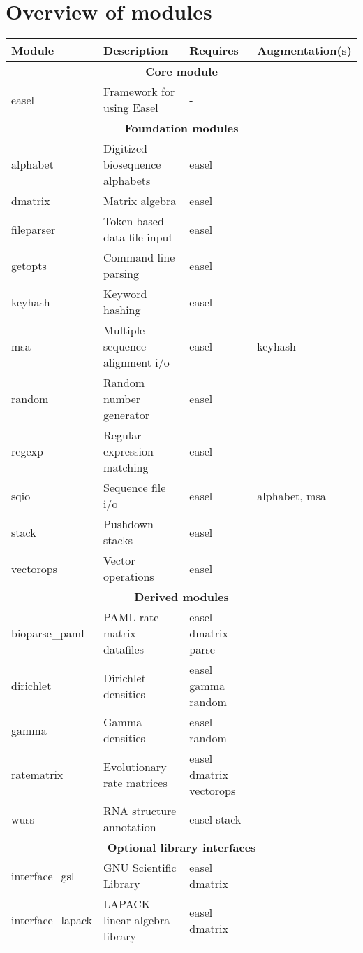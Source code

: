\section{Overview of modules}
\begin{tabular}{llll}\hline
\textbf{Module} & \textbf{Description}       & \textbf{Requires} & \textbf{Augmentation(s)}\\\hline
  \multicolumn{4}{c}{\textbf{Core module}}\\
easel           & Framework for using Easel         &  -     & \\
  \multicolumn{4}{c}{\textbf{Foundation modules}}\\
alphabet        & Digitized biosequence alphabets   & easel  & \\
dmatrix         & Matrix algebra                    & easel  & \\ 
fileparser      & Token-based data file input       & easel  & \\
getopts         & Command line parsing              & easel  & \\
keyhash         & Keyword hashing                   & easel  & \\
msa             & Multiple sequence alignment i/o   & easel  & keyhash \\
random          & Random number generator           & easel  & \\
regexp          & Regular expression matching       & easel  & \\
sqio            & Sequence file i/o                 & easel  & alphabet, msa\\
stack           & Pushdown stacks                   & easel  & \\
vectorops       & Vector operations                 & easel  & \\\hline
  \multicolumn{4}{c}{\textbf{Derived modules}}\\
bioparse\_paml  & PAML rate matrix datafiles        & easel dmatrix parse & \\
dirichlet       & Dirichlet densities               & easel gamma random & \\ 
gamma           & Gamma densities                   & easel random & \\
ratematrix      & Evolutionary rate matrices        & easel dmatrix vectorops & \\
wuss            & RNA structure annotation          & easel stack    & \\\hline
  \multicolumn{4}{c}{\textbf{Optional library interfaces}}\\
interface\_gsl    & GNU Scientific Library          & easel dmatrix & \\
interface\_lapack & LAPACK linear algebra library   & easel dmatrix & \\\hline
\end{tabular}



